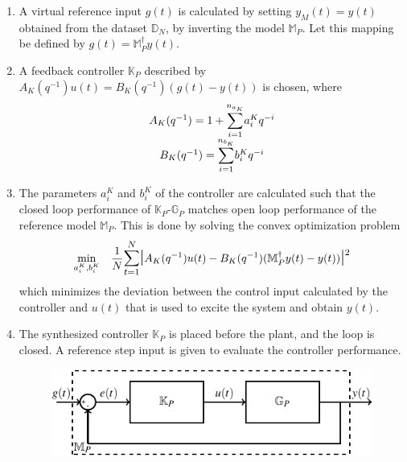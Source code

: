 \documentclass[letterpaper, 10 pt, conference]{ieeeconf}  %
\begin{document}
\begin{enumerate}
	\item
	A virtual reference input $g(t)$ is calculated by setting $y_M(t)=y(t)$ obtained from the dataset $\mathbb{D}_N$, by inverting the model $\mathbb{M}_P$. Let this mapping be defined by $g(t) = \mathbb{M}_P^{\dagger}y(t) $.
	\item
	A feedback controller $\mathbb{K}_P$ described by $A_K(q^{-1})u(t) = B_K(q^{-1})(g(t)-y(t))$ is chosen, where 
	\begin{equation*}
	\begin{matrix}
	A_K(q^{-1}) = 1+\mathlarger{\sum\limits_{i=1}^{n_{a_K}}}a_i^Kq^{-i}\\
	B_K(q^{-1}) = \mathlarger{\sum\limits_{i=1}^{n_{b_K}}}b_i^Kq^{-i}
	\end{matrix}  
	\end{equation*}
	\item
		The parameters $a_i^K$ and $b_i^K$  of the controller are calculated such that the closed loop performance of $\mathbb{K}_P$-$\mathbb{G}_P$ matches open loop performance of  the reference model $\mathbb{M}_P$.
	This is done by solving the convex optimization problem
	\begin{equation}
	\begin{aligned}
	& \underset{a_i^K,b_i^K}{\text{min}}
	& & \frac{1}{N}\mathlarger{\sum\limits_{t=1}^N}\mathlarger{\mathlarger{|}}A_K(q^{-1})u(t)-B_K(q^{-1})(\mathbb{M}_P^{\dagger}y(t)-y(t))\mathlarger{\mathlarger{|}}^2 \\
	\end{aligned}
	\label{VRFT_problem}
	\end{equation}
	which minimizes the deviation between the control input calculated by the controller and $u(t)$ that is used to excite the system and obtain $y(t)$.
	\item
	The synthesized controller $\mathbb{K}_P$ is placed before the plant, and the loop is closed. A reference step input is given to evaluate the controller performance.
	\begin{figure}[h]
		\hspace{30pt}
	\includegraphics[scale=0.8]{KpGp.pdf}

\end{figure}
\end{enumerate}
\end{document}
